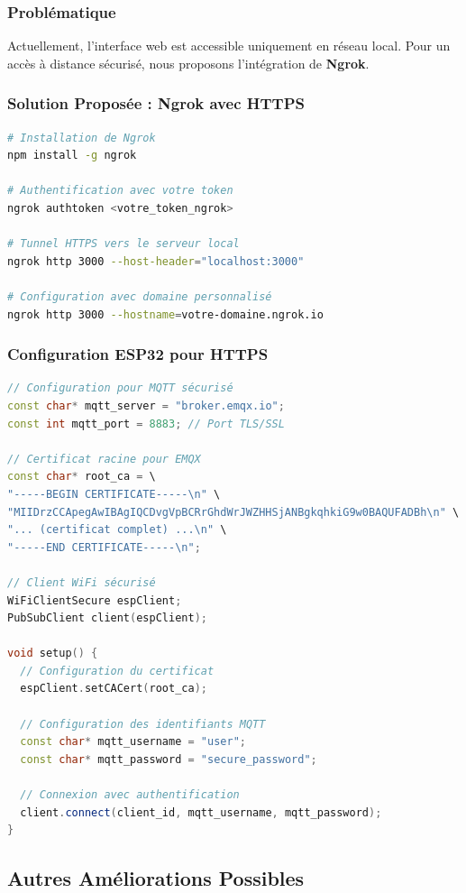 \documentclass[12pt,a4paper]{article}
\begin{document}
\subsubsection{Problématique}
Actuellement, l'interface web est accessible uniquement en réseau local. Pour un accès à distance sécurisé, nous proposons l'intégration de \textbf{Ngrok}.

\subsubsection{Solution Proposée : Ngrok avec HTTPS}
\begin{lstlisting}[language=bash, caption=Configuration de Ngrok]
# Installation de Ngrok
npm install -g ngrok

# Authentification avec votre token
ngrok authtoken <votre_token_ngrok>

# Tunnel HTTPS vers le serveur local
ngrok http 3000 --host-header="localhost:3000"

# Configuration avec domaine personnalisé
ngrok http 3000 --hostname=votre-domaine.ngrok.io
\end{lstlisting}

\subsubsection{Configuration ESP32 pour HTTPS}
\begin{lstlisting}[language=c++, caption=Support TLS/SSL sur ESP32]
// Configuration pour MQTT sécurisé
const char* mqtt_server = "broker.emqx.io";
const int mqtt_port = 8883; // Port TLS/SSL

// Certificat racine pour EMQX
const char* root_ca = \
"-----BEGIN CERTIFICATE-----\n" \
"MIIDrzCCApegAwIBAgIQCDvgVpBCRrGhdWrJWZHHSjANBgkqhkiG9w0BAQUFADBh\n" \
"... (certificat complet) ...\n" \
"-----END CERTIFICATE-----\n";

// Client WiFi sécurisé
WiFiClientSecure espClient;
PubSubClient client(espClient);

void setup() {
  // Configuration du certificat
  espClient.setCACert(root_ca);
  
  // Configuration des identifiants MQTT
  const char* mqtt_username = "user";
  const char* mqtt_password = "secure_password";
  
  // Connexion avec authentification
  client.connect(client_id, mqtt_username, mqtt_password);
}
\end{lstlisting}

\subsection{Autres Améliorations Possibles}
\end{document}
